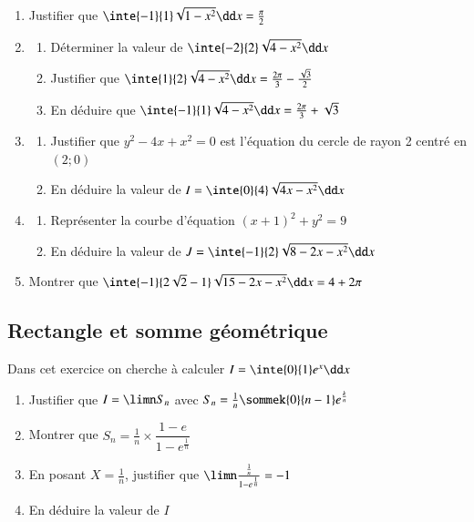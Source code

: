 \documentclass[oneside,12pt]{article}          %
\begin{document}
\begin{enumerate}
	\item Justifier que $\inte{-1}{1}\sqrt{1-x^2}\dd x=\frac{\pi}{2}$
	\item \begin{enumerate}
		\item Déterminer la valeur de $\inte{-2}{2}\sqrt{4-x^2}\dd x$
		\item Justifier que $\inte{1}{2}\sqrt{4-x^2}\dd x=\frac{2\pi}{3}-\frac{\sqrt{3}}{2}$
		\item En déduire que $\inte{-1}{1}\sqrt{4-x^2}\dd x=\frac{2\pi}{3}+\sqrt{3}$
	\end{enumerate}
	\item\begin{enumerate}
		\item Justifier que $y^2-4x+x^2=0$ est l'équation du cercle de rayon 2 centré en $(2;0)$
		\item En déduire la valeur de $I=\inte{0}{4}\sqrt{4x-x^2}\dd x$
	\end{enumerate}
	\item\begin{enumerate}
		\item Représenter la courbe d'équation $(x+1)^2+y^2=9$
		\item En déduire la valeur de $J=\inte{-1}{2}\sqrt{8-2x-x^2}\dd x$
	\end{enumerate}
	\item Montrer que $\inte{-1}{2\sqrt{2}-1}\sqrt{15-2x-x^2}\dd x=4+2\pi$
\end{enumerate}



\subsection{Rectangle et somme géométrique}
Dans cet exercice on cherche à calculer $I=\inte{0}{1}e^x\dd x$
\begin{enumerate}
	\item Justifier que $I=\limn S_n$ avec $S_n=\frac{1}{n}\sommek{0}{n-1}e^{\frac{k}{n}}$
	\item Montrer que $S_n=\frac{1}{n}\times\dfrac{1-e}{1-e^{\frac{1}{n}}}$
	\item En posant $X=\frac{1}{n}$, justifier que $\limn\frac{\frac{1}{n}}{1-e^{\frac{1}{n}}}=-1$
	\item En déduire la valeur de $I$
\end{enumerate}
\end{document}
